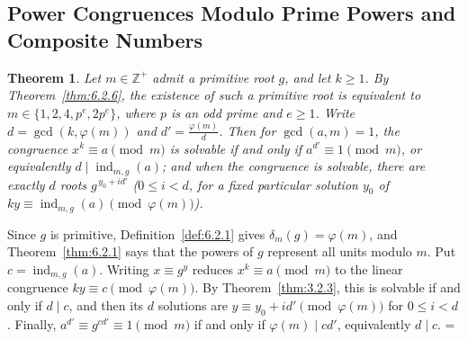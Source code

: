 \documentclass[11pt]{article}
\makeatletter
\let\nt@closedisplay\]
\def\nt@guardedclose{\@ifnextchar\par{\nt@closeafterpar}{\@ifnextchar\end{\postdisplaypenalty\@M\nt@closedisplay}{\nt@closedisplay}}}
\def\nt@closeafterpar\par{\@ifnextchar\par{\nt@closeafterpar}{\@ifnextchar\end{\postdisplaypenalty\@M\nt@closedisplay\par}{\nt@closedisplay\par}}}
\renewenvironment{proof}[1][\proofname]{\par
  \pushQED{\qed}\normalfont\topsep\medskipamount\edef\nt@afterproof{\@endparpenalty=\the\@endparpenalty\relax}\@beginparpenalty\@M\@endparpenalty\@M\let\]\nt@guardedclose\trivlist\item[]\textit{#1\@addpunct{.}} \ignorespaces}{\ifvmode\addpenalty\@M\fi\popQED\nt@afterproof\endtrivlist\@endpefalse}
\theoremstyle{ntstyle}
\newtheorem{theorem}{Theorem}[subsection]
\DeclareMathOperator{\ind}{ind}
\makeatother
\begin{document}
\subsection{Power Congruences Modulo Prime Powers and Composite Numbers}

\begin{theorem}\label{thm:7.8.1} Let $m\in\mathbb{Z}^+$ admit a primitive root
  $g$, and let $k\ge1$. By Theorem~\ref{thm:6.2.6}, the existence of such a primitive root is equivalent to
  $m\in\{1,2,4,p^e,2p^e\}$, where $p$ is an odd prime and $e\ge1$.
  Write $d = \gcd(k, \varphi(m))$ and
  $d' = \tfrac{\varphi(m)}{d}$. Then
  for $\gcd(a,m)=1$, the congruence $x^k\equiv a\pmod{m}$ is solvable
  if and only if $a^{d'} \equiv 1\pmod{m}$, or equivalently $d \mid \ind_{m,g}(a)$; and when
  the congruence is solvable, there
  are exactly $d$ roots $g^{\,y_0 + id'}$ ($0 \le i < d$, for a fixed
  particular solution $y_0$ of $ky\equiv\ind_{m,g}(a)\pmod{\varphi(m)}$).

\end{theorem}

\begin{proof} Since $g$ is primitive, Definition~\ref{def:6.2.1}
  gives $\delta_m(g)=\varphi(m)$, and Theorem~\ref{thm:6.2.1} says that the powers
  of $g$ represent all units modulo $m$. Put
  $c=\ind_{m,g}(a)$. Writing $x\equiv g^y$ reduces
  $x^k\equiv a\pmod{m}$ to the linear congruence
  $ky\equiv c\pmod{\varphi(m)}$. By Theorem~\ref{thm:3.2.3}, this is solvable if
  and only if $d\mid c$, and then its $d$ solutions are
  $y\equiv y_0+id'\pmod{\varphi(m)}$ for $0\le i<d$. Finally,
  $a^{d'}\equiv g^{cd'}\equiv1\pmod{m}$ if and only if
  $\varphi(m)\mid cd'$, equivalently $d\mid c$.
\end{proof}
\end{document}
